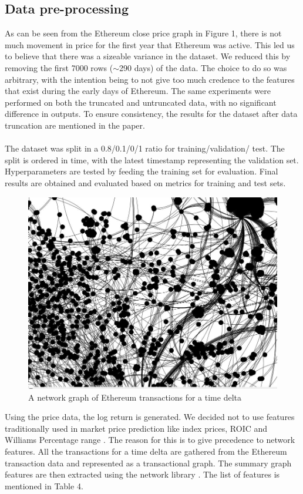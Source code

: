 \documentclass[12pt]{article}%
\begin{document}
\subsection{Data pre-processing}
As can be seen from the Ethereum close price graph in Figure 1, there is not much movement in price for the first year that Ethereum was active. This led us to believe that there was a sizeable variance in the dataset. We reduced this by removing the first 7000 rows ($\sim$290 days) of the data. The choice to do so was arbitrary, with the intention being to not give too much credence to the features that exist during the early days of Ethereum. The same experiments were performed on both the truncated and untruncated data, with no significant difference in outputs. To ensure consistency, the results for the dataset after data truncation are mentioned in the paper.

\paragraph{}The dataset was split in a 0.8/0.1/0/1 ratio for training/validation/ test. The split is ordered in time, with the latest timestamp representing the validation set.  Hyperparameters are tested by feeding the training set for evaluation. Final results are obtained and evaluated based on metrics for training and test sets.

\begin{figure}[h]
\centering
\includegraphics[width=0.8\columnwidth]{networkx}
\caption{A network graph of Ethereum transactions for a time delta}
\end{figure}


Using the price data, the log return is generated. We decided not to use features traditionally used in market price prediction like index prices, ROIC and Williams Percentage range \cite{29}. The reason for this is to give precedence to network features. All the transactions for a time delta are gathered from the Ethereum transaction data and represented as a transactional graph. The summary graph features are then extracted using the network library \cite{30}. The list of features is mentioned in Table 4.
\end{document}
